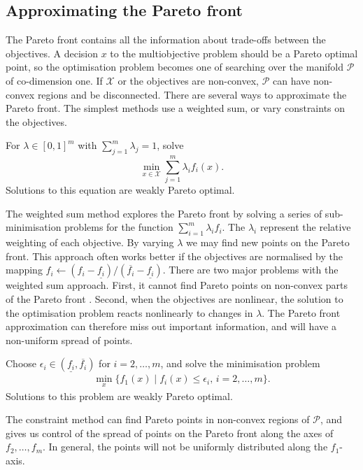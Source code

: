 \documentclass[main.tex]{subfiles}
\begin{document}
\subsection{Approximating the Pareto front}\label{sec:multi_pareto_front}
The Pareto front contains all the information about trade-offs between the
objectives. A decision $x$ to the multiobjective problem
should be a Pareto optimal point, so the
optimisation problem becomes one of searching over the manifold
$\mathcal{P}$ of co-dimension one. If $\mathcal{X}$ or the objectives are non-convex,
$\mathcal{P}$ can have non-convex regions and be
disconnected.
There are several ways to approximate the Pareto front. The simplest
methods use a weighted sum, or vary constraints on the objectives.

\begin{mydef}
  For $\lambda \in {[0,1]}^m$ with $\sum_{j=1}^m\lambda_j = 1$, solve
  \begin{equation}
    \min_{x\in\mathcal{X}} \sum_{j=1}^m \lambda_i f_i(x).
  \end{equation}
  Solutions to this equation are weakly Pareto optimal.
\end{mydef}
The weighted sum method explores the Pareto front by solving a series
of sub-minimisation problems for the function $\sum_{i=1}^m\lambda_i f_i$.
The $\lambda_i$ represent the relative weighting of each
objective. By varying $\lambda$  we may find new points on the Pareto front.
This approach often works better if the objectives are normalised by the
mapping $f_i\leftarrow (f_i-\underline
{f_i})/(\overline{f_i}-\underline{f_i})$.
There are two major problems with the weighted sum approach. First,
it cannot find Pareto points on non-convex parts of the Pareto
front \citep{messac2000aggregate}.
Second, when the objectives are nonlinear, the solution to the
optimisation problem reacts nonlinearly to changes in $\lambda$.
The Pareto front approximation can therefore miss out important
information, and will
have a non-uniform spread of points.

\begin{mydef}
  Choose
  $\epsilon_i\in(\underline{f_i},\overline{f_i})$ for $i=2,\dots,m$, and
  solve the minimisation problem
  \begin{align}
    \min_x\{f_1(x)\mid f_i(x)\leq \epsilon_i,\, i=2,\dots,m\}.
  \end{align}
  Solutions to this problem are weakly Pareto optimal.
\end{mydef}
The constraint method can find Pareto points in non-convex regions of
$\mathcal{P}$, and gives us control of the spread of points on the Pareto front
along the axes of $f_2,\dots,f_m$. In general, the points will not be
uniformly distributed along the $f_1$-axis.
\end{document}
